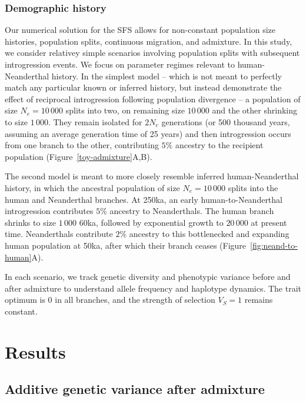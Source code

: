 \documentclass{article}
\begin{document}
\subsubsection*{Demographic history}

Our numerical solution for the SFS allows for non-constant population size
histories, population splits, continuous migration, and admixture. In this
study, we consider relativey simple scenarios involving population splits with
subsequent introgression events. We focus on parameter regimes relevant to
human-Neanderthal history. In the simplest model -- which is not meant to
perfectly match any particular known or inferred history, but instead
demonstrate the effect of reciprocal introgression following population
divergence -- a population of size $N_e=10\,000$ splits into two, on remaining
size $10\,000$ and the other shrinking to size $1\,000$. They remain isolated
for $2N_e$ generations (or 500 thousand years, assuming an average generation
time of 25 years) and then introgression occurs from one branch to the other,
contributing $5\%$ ancestry to the recipient population
(Figure~\ref{toy-admixture}A,B).

The second model is meant to more closely resemble inferred human-Neanderthal
history, in which the ancestral population of size $N_e=10\,000$ splits into
the human and Neanderthal branches. At 250ka, an early human-to-Neanderthal
introgression contributes $5\%$ ancestry to Neanderthals. The human branch
shrinks to size $1\,000$ 60ka, followed by exponential growth to $20\,000$ at
present time. Neanderthals contribute $2\%$ ancestry to this bottlenecked and
expanding human population at 50ka, after which their branch ceases
(Figure~\ref{fig:neand-to-human}A).

In each scenario, we track genetic diversity and phenotypic variance before and
after admixture to understand allele frequency and haplotype dynamics. The
trait optimum is $0$ in all branches, and the strength of selection $V_S=1$
remains constant.

\section*{Results}

\subsection*{Additive genetic variance after admixture}
\end{document}
